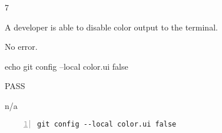 \begin{description}[align=right,leftmargin=3.2cm,labelindent=3.0cm]
\item[Step:] 7
\item[Confirm:] A developer is able to disable color output to the terminal.
\item[Expectation:] No error.
\item[Command:] echo git  config --local color.ui false
\item[Test Result:] PASS
\item[Evidence:] n/a
\end{description}
\begin{lstlisting}[numbers=left]
git config --local color.ui false

\end{lstlisting}
